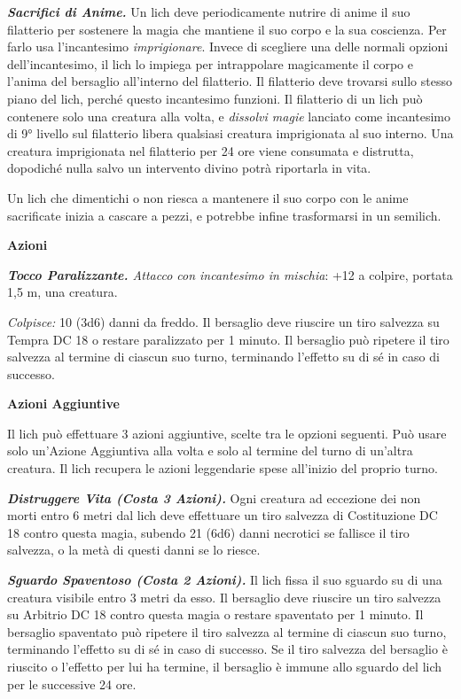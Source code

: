 \begin{multicols}{2}
\emph{\textbf{Sacrifici di Anime.}} Un lich deve periodicamente nutrire
di anime il suo filatterio per sostenere la magia che mantiene il suo
corpo e la sua coscienza. Per farlo usa l'incantesimo
\emph{imprigionare}. Invece di scegliere una delle normali opzioni
dell'incantesimo, il lich lo impiega per intrappolare magicamente il
corpo e l'anima del bersaglio all'interno del filatterio. Il filatterio
deve trovarsi sullo stesso piano del lich, perché questo incantesimo
funzioni. Il filatterio di un lich può contenere solo una creatura alla
volta, e \emph{dissolvi magie} lanciato come incantesimo di 9° livello
sul filatterio libera qualsiasi creatura imprigionata al suo interno.
Una creatura imprigionata nel filatterio per 24 ore viene consumata e
distrutta, dopodiché nulla salvo un intervento divino potrà riportarla
in vita.

Un lich che dimentichi o non riesca a mantenere il suo corpo con le
anime sacrificate inizia a cascare a pezzi, e potrebbe infine
trasformarsi in un semilich.

\textbf{Azioni}

\emph{\textbf{Tocco Paralizzante.} Attacco con incantesimo in mischia}:
+12 a colpire, portata 1,5 m, una creatura.

\emph{Colpisce:} 10 (3d6) danni da freddo. Il bersaglio deve riuscire un
tiro salvezza su Tempra DC 18 o restare paralizzato per 1 minuto.
Il bersaglio può ripetere il tiro salvezza al termine di ciascun suo
turno, terminando l'effetto su di sé in caso di successo.

\textbf{Azioni Aggiuntive}

Il lich può effettuare 3 azioni aggiuntive, scelte tra le opzioni
seguenti. Può usare solo un'Azione Aggiuntiva alla volta e solo al
termine del turno di un'altra creatura. Il lich recupera le azioni
leggendarie spese all'inizio del proprio turno.

\emph{\textbf{Distruggere Vita (Costa 3 Azioni).}} Ogni creatura ad
eccezione dei non morti entro 6 metri dal lich deve effettuare un tiro
salvezza di Costituzione DC 18 contro questa magia, subendo 21 (6d6)
danni necrotici se fallisce il tiro salvezza, o la metà di questi danni
se lo riesce.

\emph{\textbf{Sguardo Spaventoso (Costa 2 Azioni).}} Il lich fissa il
suo sguardo su di una creatura visibile entro 3 metri da esso. Il
bersaglio deve riuscire un tiro salvezza su Arbitrio DC 18 contro questa
magia o restare spaventato per 1 minuto. Il bersaglio spaventato può
ripetere il tiro salvezza al termine di ciascun suo turno, terminando
l'effetto su di sé in caso di successo. Se il tiro salvezza del
bersaglio è riuscito o l'effetto per lui ha termine, il bersaglio è
immune allo sguardo del lich per le successive 24 ore.


\end{multicols}
